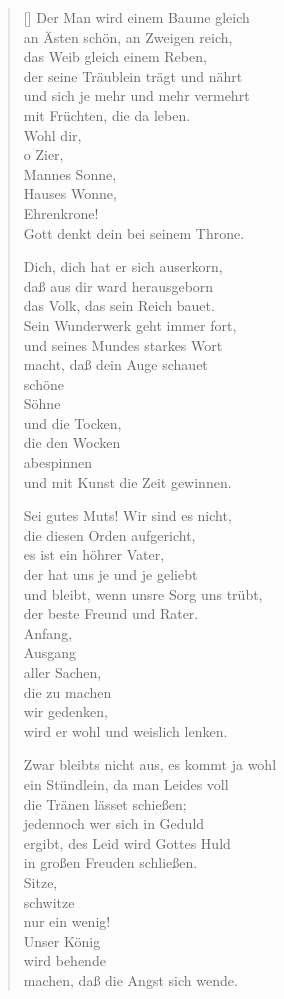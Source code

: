 \begin{multicols}{2}
\begin{verse}[\versewidth]
 Der Man wird einem Baume gleich\\
an Ästen schön, an Zweigen reich,\\
das Weib gleich einem Reben,\\
der seine Träublein trägt und nährt\\
und sich je mehr und mehr vermehrt\\
mit Früchten, die da leben.\\
Wohl dir,\\
o Zier,\\
Mannes Sonne,\\
Hauses Wonne,\\
Ehrenkrone!\\
Gott denkt dein bei seinem Throne.

 Dich, dich hat er sich auserkorn,\\
daß aus dir ward herausgeborn\\
das Volk, das sein Reich bauet.\\
Sein Wunderwerk geht immer fort,\\
und seines Mundes starkes Wort\\
macht, daß dein Auge schauet\\
schöne\\
Söhne\\
und die Tocken,\\
die den Wocken\\
abespinnen\\
und mit Kunst die Zeit gewinnen.

 Sei gutes Muts! Wir sind es nicht,\\
die diesen Orden aufgericht,\\
es ist ein höhrer Vater,\\
der hat uns je und je geliebt\\
und bleibt, wenn unsre Sorg uns trübt,\\
der beste Freund und Rater.\\
Anfang,\\
Ausgang\\
aller Sachen,\\
die zu machen\\
wir gedenken,\\
wird er wohl und weislich lenken.

 Zwar bleibts nicht aus, es kommt ja wohl\\
ein Stündlein, da man Leides voll\\
die Tränen lässet schießen;\\
jedennoch wer sich in Geduld\\
ergibt, des Leid wird Gottes Huld\\
in großen Freuden schließen.\\
Sitze,\\
schwitze\\
nur ein wenig!\\
Unser König\\
wird behende\\
machen, daß die Angst sich wende.


\end{verse}
\end{multicols}
